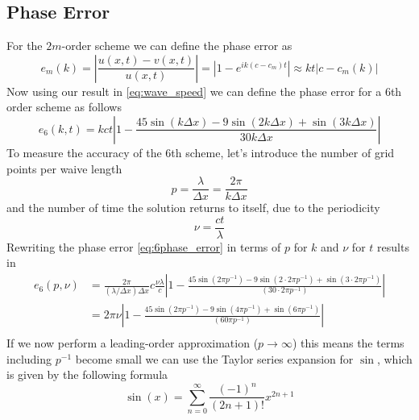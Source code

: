 \subsection*{Phase Error}
For the $2m$-order scheme we can define the phase error as
\begin{equation}
	e_m(k)=\left|\frac{u(x, t)-v(x, t)}{u(x, t)}\right|=\left|1-e^{i k\left(c-c_m\right) t}\right| \approx k t\left|c-c_m(k)\right|
	\label{eq:phase_error}
\end{equation}
Now using our result in \eqref{eq:wave_speed} we can define the phase error for a 6th order scheme as follows
\begin{equation}
	e_6(k, t)=kct\left|1- \frac{45 \sin (k \Delta x) - 9 \sin (2k \Delta x) + \sin (3k \Delta x) }{30 k\Delta x}\right|
	\label{eq:6phase_error}
\end{equation}
To measure the accuracy of the 6th scheme, let's introduce the number of grid points per waive length
\begin{equation}
	p = \frac{\lambda}{\Delta x}= \frac{2 \pi}{k \Delta x}
	\label{eq:n_gp}
\end{equation}
and the number of time the solution returns to itself, due to the periodicity
\begin{equation}
	\nu = \frac{ct}{\lambda}
	\label{eq:periodicity}
\end{equation}
Rewriting the phase error \eqref{eq:6phase_error} in terms of $p$ for $k$ and $\nu$ for $t$ results in
\begin{equation}
	\begin{aligned}
		e_6(p, \nu) & = \frac{2 \pi}{(\lambda/ \Delta x) \Delta x} c \frac{\nu \lambda}{c} \left|1- \frac{45 \sin (2 \pi p^{-1}) - 9 \sin (2 \cdot 2 \pi p^{-1}) + \sin (3 \cdot 2 \pi p^{-1}) }{(30 \cdot 2 \pi p^{-1})}\right| \\
		            & = 2 \pi \nu \left|1- \frac{45 \sin (2 \pi p^{-1}) - 9 \sin (4 \pi p^{-1}) + \sin (6 \pi p^{-1})}{(60 \pi p^{-1})}\right|                                                                                   \\
	\end{aligned}
	\label{eq:6phase_error_pnu}
\end{equation}
If we now perform a leading-order approximation ($p \rightarrow \infty$) this means the terms including $p^{-1}$ become small we can use the Taylor series expansion for $\sin$, which is given by the following formula
\begin{equation}
	\sin (x)=\sum_{n=0}^{\infty} \frac{(-1)^n}{(2 n+1)!} x^{2 n+1}
\end{equation}
